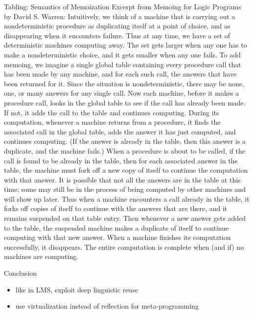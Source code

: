 \documentclass{beamer}
\begin{document}
\begin{frame}[fragile]{Tabling: Semantics of Memoization}
Excerpt from Memoing for Logic Programs by David S. Warren:
\tiny
Intuitively, we think of a machine that is carrying out a nondeterministic procedure as duplicating itself at a point of choice, and as disappearing when it encounters failure. Thus at any time, we have a set of deterministic machines computing away. The set gets larger when any one has to make a nondeterministic choice, and it gets smaller when any one fails. To add memoing, we imagine a single global table containing every procedure call that has been made by any machine, and for each such call, the answers that have been returned for it. Since the situation is nondeterministic, there may be none, one, or many answers for any single call. Now each machine, before it makes a procedure call, looks in the global table to see if the call has already been made. If not, it adds the call to the table and continues computing. During its computation, whenever a machine returns from a procedure, it finds the associated call in the global table, adds the answer it has just computed, and continues computing. (If the answer is already in the table, then this answer is a duplicate, and the machine fails.) When a procedure is about to be called, if the call is found to be already in the table, then for each associated answer in the table, the machine must fork off a new copy of itself to continue the computation with that answer. It is possible that not all the answers are in the table at this time; some may still be in the process of being computed by other machines and will show up later. Thus when a machine encounters a call already in the table, it forks off copies of itself to continue with the answers that are there, and it remains suspended on that table entry. Then whenever a new answer gets added to the table, the suspended machine makes a duplicate of itself to continue computing with that new answer. When a machine finishes its computation successfully, it disappears. The entire computation is complete when (and if) no machines are computing.
\end{frame}

\begin{frame}[fragile]{Conclusion}
\begin{itemize}
\item like in LMS, exploit deep linguistic reuse
\item use virtualization instead of reflection for meta-programming
\end{itemize}
\end{frame}
\end{document}
